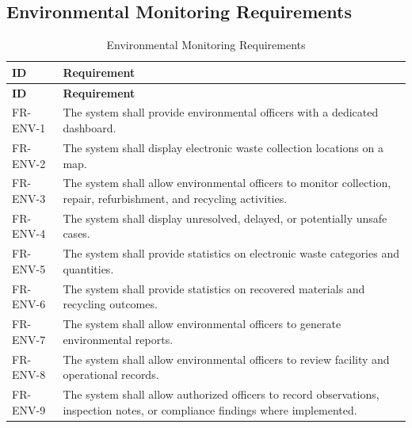 \subsection{Environmental Monitoring Requirements}
\begin{longtable}{@{}p{2.4cm}p{11cm}@{}}
\caption{Environmental Monitoring Requirements} \label{tab:fr-env} \\
\toprule \textbf{ID} & \textbf{Requirement} \\ \midrule
\endfirsthead
\toprule \textbf{ID} & \textbf{Requirement} \\ \midrule
\endhead
FR-ENV-1 & The system shall provide environmental officers with a dedicated dashboard. \\
FR-ENV-2 & The system shall display electronic waste collection locations on a map. \\
FR-ENV-3 & The system shall allow environmental officers to monitor collection, repair, refurbishment, and recycling activities. \\
FR-ENV-4 & The system shall display unresolved, delayed, or potentially unsafe cases. \\
FR-ENV-5 & The system shall provide statistics on electronic waste categories and quantities. \\
FR-ENV-6 & The system shall provide statistics on recovered materials and recycling outcomes. \\
FR-ENV-7 & The system shall allow environmental officers to generate environmental reports. \\
FR-ENV-8 & The system shall allow environmental officers to review facility and operational records. \\
FR-ENV-9 & The system shall allow authorized officers to record observations, inspection notes, or compliance findings where implemented. \\
\bottomrule
\end{longtable}


